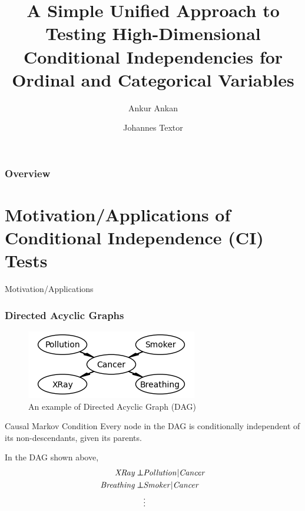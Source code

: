 \documentclass{beamer}
\def\ci{\perp\!\!\!\!\!\perp}
\begin{document}
\title[Unified CI test for Ordinal and Categorical Variables]{A Simple Unified Approach to Testing High-Dimensional Conditional Independencies for Ordinal and Categorical Variables}
\author {Ankur Ankan \and Johannes Textor}
\date{}
\maketitle

\begin{frame}
	\frametitle{Overview}
	\tableofcontents
\end{frame}

\section{Motivation/Applications of Conditional Independence (CI) Tests}
\begin{frame}
	\begin{center} \Huge{Motivation/Applications} \end{center}
\end{frame}
\begin{frame}
	\frametitle{Directed Acyclic Graphs}
	\begin{figure}
		\centering
		\includegraphics[scale=0.6]{imgs/example_dag.png}
		\caption*{An example of Directed Acyclic Graph (DAG) \footnotemark}
	\end{figure}
	\begin{block}{Causal Markov Condition}
		Every node in the DAG is conditionally independent of its non-descendants, given its parents.
	\end{block}
	In the DAG shown above,
	\begin{equation*}
		\begin{split}
			\text{\emph{XRay}} \ci & \text{\emph{Pollution}} | \text{\emph{Cancer}} \\
			\text{\emph{Breathing}} \ci & \text{\emph{Smoker}} | \text{\emph{Cancer}} \\
			& \vdots \\
		\end{split}
	\end{equation*}
\end{frame}
\end{document}
